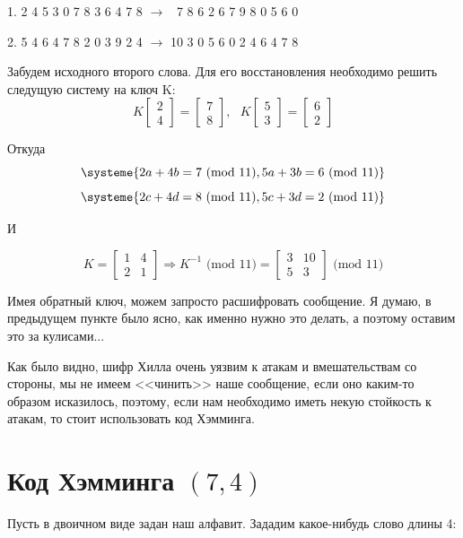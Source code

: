 \documentclass[a4paper,hidelinks,14pt]{extarticle}
\begin{document}
	1. 2 4 5 3 0 7 8 3 6 4 7 8 $\rightarrow$ \ 7 8 6 2 6 7 9 8 0 5 6 0
	
	2. 5 4 6 4 7 8 2 0 3 9 2 4 $\rightarrow$ 10 3 0 5 6 0 2 4 6 4 7 8
	\vspace{5mm}
	
	Забудем исходного второго слова. Для его восстановления необходимо решить следущую систему на ключ K:
	$$
	K\begin{bmatrix}
		2\\
		4
	\end{bmatrix}
	=
	\begin{bmatrix}
		7 \\
		8
	\end{bmatrix}, \text{ }
	K\begin{bmatrix}
		5\\
		3
	\end{bmatrix}
	=
	\begin{bmatrix}
		6 \\
		2
	\end{bmatrix}
	$$
	
	Откуда
	$$ 
	\systeme{2a + 4b = 7 \text{ (mod 11)}, 5a + 3b = 6\text{ (mod 11)}}
	$$
	$$
	\systeme{2c + 4d = 8 \text{ (mod 11)}, 5c + 3d = 2 \text{ (mod 11)}}
	$$
	
	И
	
	$$
	K = \begin{bmatrix}
		1 & 4 \\
		2 & 1
	\end{bmatrix} \Rightarrow K^{-1} \text{ (mod 11)} = 
	\begin{bmatrix}
		3 & 10 \\
		5 & 3
	\end{bmatrix}
	\text{ (mod 11)}
	$$
	
	Имея обратный ключ, можем запросто расшифровать сообщение. Я думаю, в предыдущем пункте было ясно, как именно нужно это делать, а поэтому оставим это за кулисами...
	
	Как было видно, шифр Хилла очень уязвим к атакам и вмешательствам со стороны, мы не имеем <<чинить>> наше сообщение, если оно каким-то образом исказилось, поэтому, если нам необходимо иметь некую стойкость к атакам, то стоит использовать код Хэмминга.
	
	\section{Код Хэмминга $(7,4)$}
	Пусть в двоичном виде задан наш алфавит. Зададим какое-нибудь слово длины 4:
	
\end{document}
